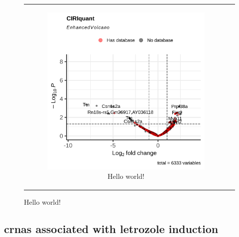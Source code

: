 \begin{figure}[H]
\begin{tabular}{cc}
\begin{subfigure}{0.5\textwidth}
            \includegraphics[width=\linewidth]{chapters/4_results_and_discussion/figures/dea/ciriquant/tamoxifen/volcano.png}
            \caption{Hello world!
            }
            \label{fig:tamoxifen_volcano_ciriquant}
        \end{subfigure} &

    \end{tabular}
    \caption{Hello world!
    }
    \label{fig:tamoxifen_volcano}
\end{figure}

\subsection{\Glspl{crna} associated with letrozole induction}

